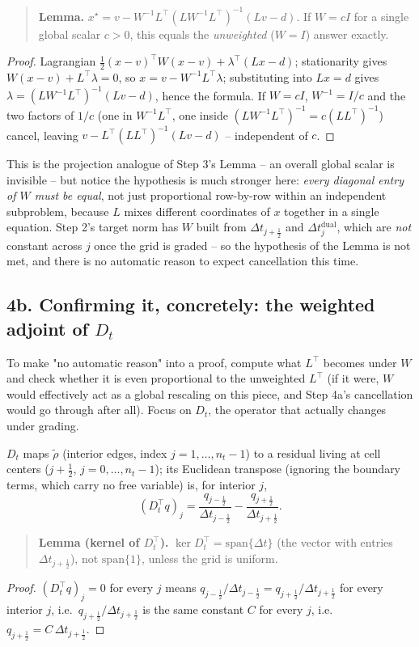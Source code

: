 \documentclass[11pt]{article}
\newcommand{\dt}{\Delta t}
\newcommand{\half}{\tfrac12}
\begin{document}
\begin{quote}
\textbf{Lemma.} $x^\star = v - W^{-1}L^\top(LW^{-1}L^\top)^{-1}(Lv-d)$. If $W=cI$ for a single
global scalar $c>0$, this equals the \emph{unweighted} ($W=I$) answer exactly.
\end{quote}
\begin{proof}
Lagrangian $\tfrac12(x-v)^\top W(x-v)+\lambda^\top(Lx-d)$; stationarity gives
$W(x-v)+L^\top\lambda=0$, so $x=v-W^{-1}L^\top\lambda$; substituting into $Lx=d$ gives
$\lambda=(LW^{-1}L^\top)^{-1}(Lv-d)$, hence the formula. If $W=cI$, $W^{-1}=I/c$ and the two
factors of $1/c$ (one in $W^{-1}L^\top$, one inside $(LW^{-1}L^\top)^{-1}=c(LL^\top)^{-1}$) cancel,
leaving $v-L^\top(LL^\top)^{-1}(Lv-d)$ -- independent of $c$. \qedhere
\end{proof}

This is the projection analogue of Step 3's Lemma -- an overall global scalar is invisible -- but
notice the hypothesis is much stronger here: \emph{every diagonal entry of $W$ must be equal}, not
just proportional row-by-row within an independent subproblem, because $L$ mixes different
coordinates of $x$ together in a single equation. Step 2's target norm has $W$ built from
$\dt_{j+\half}$ and $\dt_j^\mathrm{dual}$, which are \emph{not} constant across $j$ once the grid
is graded -- so the hypothesis of the Lemma is not met, and there is no automatic reason to expect
cancellation this time.

\subsection*{4b. Confirming it, concretely: the weighted adjoint of $D_t$}

To make "no automatic reason" into a proof, compute what $L^\top$ becomes under $W$ and check
whether it is even proportional to the unweighted $L^\top$ (if it were, $W$ would effectively act
as a global rescaling on this piece, and Step 4a's cancellation would go through after all).
Focus on $D_t$, the operator that actually changes under grading.

$D_t$ maps $\tilde\rho$ (interior edges, index $j=1,\dots,n_t-1$) to a residual living at cell
centers ($j+\half$, $j=0,\dots,n_t-1$); its Euclidean transpose (ignoring the boundary terms, which
carry no free variable) is, for interior $j$,
\[
  (D_t^\top q)_j = \frac{q_{j-\half}}{\dt_{j-\half}} - \frac{q_{j+\half}}{\dt_{j+\half}}.
\]

\begin{quote}
\textbf{Lemma (kernel of $D_t^\top$).} $\ker D_t^\top = \mathrm{span}\{\dt\}$ (the vector with
entries $\dt_{j+\half}$), not $\mathrm{span}\{1\}$, unless the grid is uniform.
\end{quote}
\begin{proof}
$(D_t^\top q)_j=0$ for every $j$ means $q_{j-\half}/\dt_{j-\half}=q_{j+\half}/\dt_{j+\half}$ for
every interior $j$, i.e.\ $q_{j+\half}/\dt_{j+\half}$ is the same constant $C$ for every $j$, i.e.\
$q_{j+\half}=C\,\dt_{j+\half}$. \qedhere
\end{proof}
\end{document}

